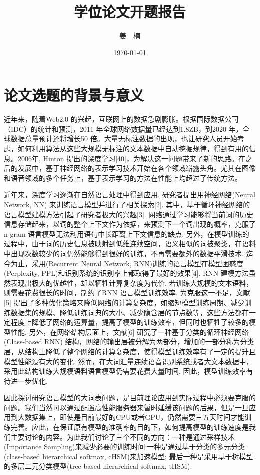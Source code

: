 \documentclass[12pt,a4paper]{article}
\title{学位论文开题报告}
\author{姜~~楠}
\date{\today}
\begin{document}
\maketitle

\tableofcontents
\newpage


\section{论文选题的背景与意义}
近年来，随着Web2.0 的兴起，互联网上的数据急剧膨胀。根据国际数据公司（IDC）的统计和预测，2011 年全球网络数据量已经达到1.8ZB，到2020 年，全球数据总量预计还将增长50 倍。大量无标注数据的出现，也让研究人员开始考虑，如何利用算法从这些大规模无标注的文本数据中自动挖掘规律，得到有用的信息。2006年, Hinton 提出的深度学习[40]，为解决这一问题带来了新的思路。在之后的发展中，基于神经网络的表示学习技术开始在各个领域崭露头角。尤其在图像和语音领域的多个任务上，基于表示学习的方法在性能上均超过了传统方法。

近年来，深度学习逐渐在自然语言处理中得到应用. 研究者提出用神经网络(Neural Network, NN) 来训练语言模型并进行了相关探索[2]. 其中，基于循环神经网络的语言模型建模方法引起了研究者极大的兴趣[3]. 网络通过学习能够将当前词的历史信息存储起来，以词的整个上下文作为依据，来预测下一个词出现的概率，克服了n-gram 语言模型无法利用语句中长距离上下文信息的缺点. 另外，在模型训练的过程中，由于词的历史信息被映射到低维连续空间，语义相似的词被聚类，在语料中出现次数较少的词仍然能够得到很好的训练，不再需要额外的数据平滑技术. 迄今为止，采用(Recurrent Neural Network, RNN)训练的语言模型在模型困惑度(Perplexity, PPL)和识别系统的识别率上都取得了最好的效果[4]. RNN 建模方法虽然表现出极大的优越性，却以牺牲计算复杂度为代价. 若训练大规模的文本语料，则需要花费很长的时间，制约了RNN 语言模型训练效率. 为克服这一不足，文献[5] 提出了多种优化策略来降低网络的计算复杂度，如缩短模型训练周期、减少训练数据集的规模、降低训练词典的大小、减少隐含层的节点数等，这些方法都在一定程度上降低了网络的运算量，提高了模型的训练效率，但同时也牺牲了较多的模型性能. 另外，在网络结构层面上，文献[6] 研究了一种基于分类的循环神经网络(Class-based RNN) 结构，网络的输出层被分解为两部分，增加的一部分称为分类层，从结构上降低了整个网络的计算复杂度，使得模型训练效率有了一定的提升且模型性能没有大的变化. 然而，在大词汇量连续语音识别系统或者大文本数据中，采用此结构训练大规模语料语言模型仍需要花费大量时间. 因此，模型训练效率有待进一步优化.

因此探讨研究语言模型的大词表问题，是目前理论应用到实际过程中必须要克服的问题。我们当然可以通过配置高性能服务器来暂时延缓该问题的后果，但是一旦应用到大数据集上，即使是目前最好的CPU或者GPU，仍然需要三五天时间才能训练完善。应此，在保证原有模型的准确率的目的下，如何提高模型的训练速度是我们主要讨论的内容。为此我们讨论了三个不同的方向：一种是通过采样技术(Importance Sampling)来减少必要的训练时间;一种是通过基于分类的多元分类(class-based hierarchical softmax, cHSM)来加速模型; 最后一种是采用基于树模型的多层二元分类模型(tree-based hierarchical softmax, tHSM).
\end{document}
